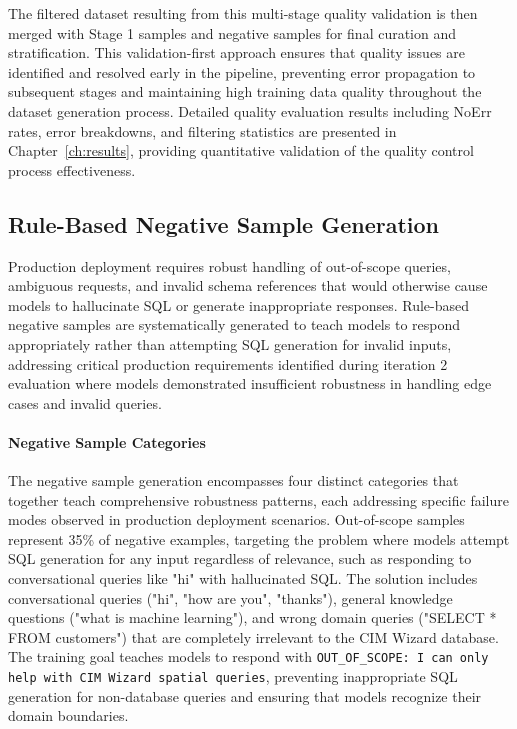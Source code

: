 The filtered dataset resulting from this multi-stage quality validation is then merged with Stage 1 samples and negative samples for final curation and stratification. This validation-first approach ensures that quality issues are identified and resolved early in the pipeline, preventing error propagation to subsequent stages and maintaining high training data quality throughout the dataset generation process. Detailed quality evaluation results including NoErr rates, error breakdowns, and filtering statistics are presented in Chapter~\ref{ch:results}, providing quantitative validation of the quality control process effectiveness.

\subsection{Rule-Based Negative Sample Generation}

Production deployment requires robust handling of out-of-scope queries, ambiguous requests, and invalid schema references that would otherwise cause models to hallucinate SQL or generate inappropriate responses. Rule-based negative samples are systematically generated to teach models to respond appropriately rather than attempting SQL generation for invalid inputs, addressing critical production requirements identified during iteration 2 evaluation where models demonstrated insufficient robustness in handling edge cases and invalid queries.

\paragraph{Negative Sample Categories}

The negative sample generation encompasses four distinct categories that together teach comprehensive robustness patterns, each addressing specific failure modes observed in production deployment scenarios. Out-of-scope samples represent 35\% of negative examples, targeting the problem where models attempt SQL generation for any input regardless of relevance, such as responding to conversational queries like "hi" with hallucinated SQL. The solution includes conversational queries ("hi", "how are you", "thanks"), general knowledge questions ("what is machine learning"), and wrong domain queries ("SELECT * FROM customers") that are completely irrelevant to the CIM Wizard database. The training goal teaches models to respond with \texttt{OUT\_OF\_SCOPE: I can only help with CIM Wizard spatial queries}, preventing inappropriate SQL generation for non-database queries and ensuring that models recognize their domain boundaries.

